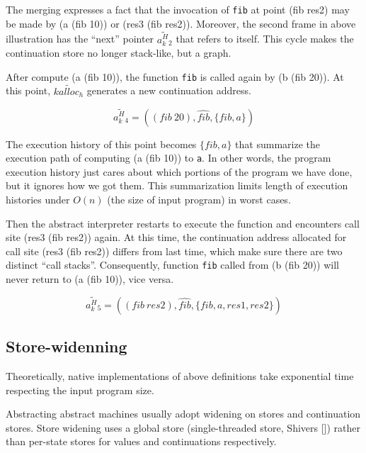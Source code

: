 \documentclass{article}
\begin{document}
The merging expresses a fact that the invocation of \verb|fib| at point (fib res2) may be made by (a (fib 10)) or (res3 (fib res2)). Moreover, the second frame in above illustration has the ``next'' pointer $\widetilde{a^H_k{}_2}$ that refers to itself. This cycle makes the continuation store no longer stack-like, but a graph.

After compute (a (fib 10)), the function \verb|fib| is called again by (b (fib 20)). At this point, $\widetilde{kalloc_h}$ generates a new continuation address.

\[
\widetilde{a^H_k{}_4} = ((fib\ 20), \widehat{fib}, \{fib, a\})
\]

The execution history of this point becomes $\{fib, a\}$ that summarize the execution path of computing (a (fib 10)) to \verb|a|. In other words, the program execution history just cares about which portions of the program we have done, but it ignores how we got them. This summarization limits length of execution histories under $O(\textit{n})$ (the size of input program) in worst cases.

Then the abstract interpreter restarts to execute the function and encounters call site (res3 (fib res2)) again. At this time, the continuation address allocated for call site (res3 (fib res2)) differs from last time, which make sure there are two distinct ``call stacks''. Consequently, function \verb|fib| called from (b (fib 20)) will never return to (a (fib 10)), vice versa.

\[
\widetilde{a^H_k{}_5} = ((fib\ res2), \widehat{fib}, \{fib, a, res1, res2\})
\]

\subsection{Store-widenning}
\label{sub:Store-widenning}
Theoretically, native implementations of above definitions take exponential time respecting the input program size.

Abstracting abstract machines usually adopt widening on stores and continuation stores. Store widening uses a global store (single-threaded store, Shivers []) rather than per-state stores for values and continuations respectively.
\end{document}
